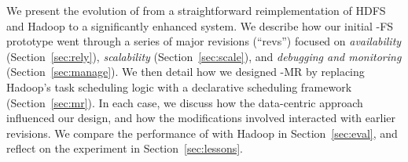 

We present the evolution of \BOOMA from a straightforward reimplementation of
HDFS and Hadoop to a significantly enhanced system.  We describe how our initial
\BOOM-FS prototype went through a series of major revisions (``revs'') focused
on \emph{availability} (Section~\ref{sec:rely}), \emph{scalability}
(Section~\ref{sec:scale}), and \emph{debugging and monitoring}
(Section~\ref{sec:manage}). We then detail how we designed \BOOM-MR by replacing
Hadoop's task scheduling logic with a declarative scheduling framework
(Section~\ref{sec:mr}). In each case, we discuss how the
data-centric approach influenced our design, and how the modifications involved
interacted with earlier revisions.  We compare the performance of \BOOMA with
Hadoop in Section~\ref{sec:eval}, and reflect on the experiment in
Section~\ref{sec:lessons}.


